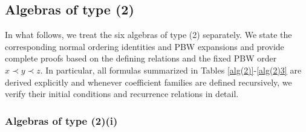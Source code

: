 \documentclass{amsart}
\theoremstyle{definition}
\theoremstyle{remark}
\numberwithin{equation}{section}
\begin{document}
\subsection{Algebras of type (2)}

In what follows, we treat the six algebras of type (2) separately. We state the corresponding normal ordering identities and PBW expansions and provide complete proofs based on the defining relations and the fixed PBW order $x\prec y\prec z$. In particular, all formulas summarized in Tables \ref{alg(2)}-\ref{alg(2)3} are derived explicitly and whenever coefficient families are defined recursively, we verify their initial conditions and recurrence relations in detail.


\subsubsection{Algebras of type (2)(i)}
\end{document}
